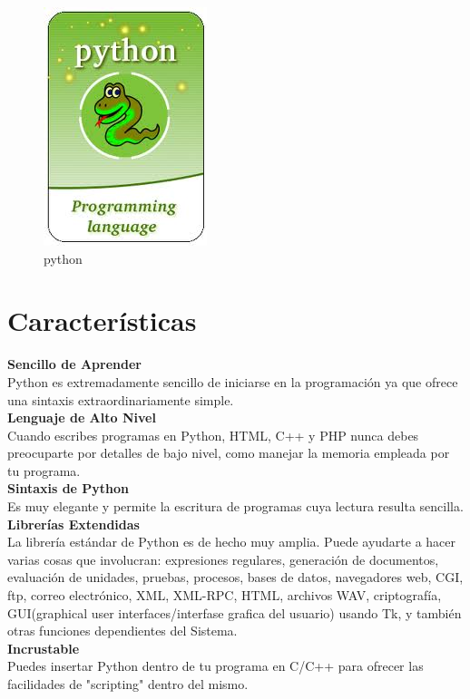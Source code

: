 \documentclass[11pt]{article} %
\begin{document}
\begin{figure}[htbp]
\begin{center}
\includegraphics[width=.30\textwidth]{./imagenes/pythonXD.jpg}
\caption{python}
\label{qt}
\end{center}
\end{figure}

\section{Características}

\textbf{Sencillo de Aprender}
\\    Python es extremadamente sencillo de iniciarse en la programación ya que ofrece una sintaxis extraordinariamente simple.\\

\textbf{Lenguaje de Alto Nivel}
\\    Cuando escribes programas en Python, HTML, C++ y PHP  nunca debes preocuparte por detalles de bajo nivel, como manejar la memoria empleada por tu programa.\\

\textbf{Sintaxis de Python}
\\	  Es muy elegante y permite la escritura de programas cuya lectura resulta sencilla.\\

\textbf{Librerías Extendidas}
\\	  La librería estándar de Python es de hecho muy amplia. Puede ayudarte a hacer varias cosas que involucran: expresiones regulares, generación de documentos, evaluación de unidades, pruebas, procesos, bases de datos, navegadores web, CGI, ftp, correo electrónico, XML, XML-RPC, HTML, archivos WAV, criptografía, GUI(graphical user interfaces/interfase grafica del usuario) usando Tk, y también otras funciones dependientes del Sistema.\\

\textbf{Incrustable}
\\    Puedes insertar Python dentro de tu programa en C/C++ para ofrecer las facilidades de "scripting" dentro del mismo.\\
\end{document}

